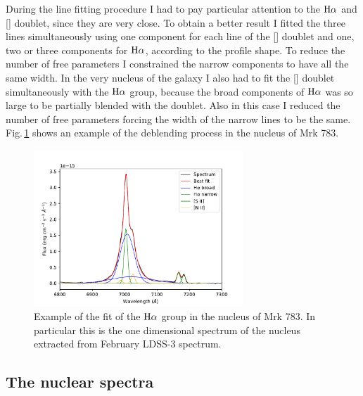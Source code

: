 \documentclass[../main.tex]{subfiles}
\begin{document}
During the line fitting procedure I had to pay particular attention to the $\rm H\alpha$ and [] doublet, since they are very close.
To obtain a better result I fitted the three lines simultaneously using one component for each line of the [] doublet and one, two or three components for $\rm H\alpha$, according to the profile shape.
To reduce the number of free parameters I constrained the narrow components to have all the same width.
In the very nucleus of the galaxy I also had to fit the [] doublet  simultaneously with the $\rm H\alpha$ group, because the broad components of $\rm H\alpha$ was so large to be partially blended with the doublet.
Also in this case I reduced the number of free parameters forcing the width of the narrow lines to be the same.
Fig.\,\ref{fig:pap3_deblending} shows an example of the deblending process in the nucleus of Mrk 783.

\begin{figure}
\centering
\includegraphics[width=0.7\textwidth]{images/paper3/deblending.pdf} 
\caption[]{Example of the fit of the $\rm H\alpha$ group in the nucleus of Mrk 783. In particular this is the one dimensional spectrum of the nucleus extracted from February LDSS-3 spectrum.} 
\label{fig:pap3_deblending}
\end{figure} 


\subsection{The nuclear spectra}
\end{document}
